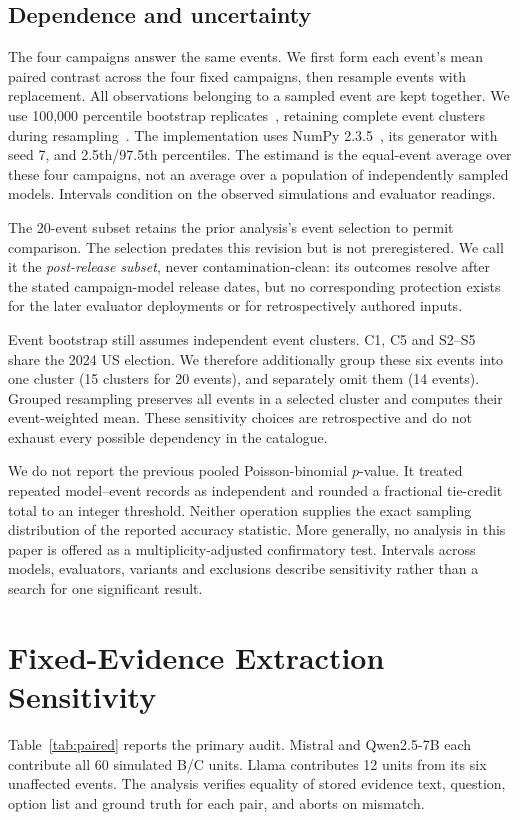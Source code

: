 \documentclass[10pt,conference]{IEEEtran}
\begin{document}
\subsection{Dependence and uncertainty}
\label{sec:inference}
The four campaigns answer the same events. We first form each event's mean
paired contrast across the four fixed campaigns, then resample events with
replacement. All observations belonging to a sampled event are kept together.
We use 100,000 percentile bootstrap replicates~\cite{efron1979}, retaining
complete event clusters during resampling~\cite{cameron2008cluster}. The
implementation uses NumPy 2.3.5~\cite{harris2020numpy}, its generator with seed 7,
and 2.5th/97.5th percentiles. The estimand is the equal-event average over these
four campaigns, not an average over a population of independently sampled models.
Intervals condition on the observed simulations and evaluator readings.

The 20-event subset retains the prior analysis's event selection to permit
comparison. The selection predates this revision but is not preregistered.
We call it the \emph{post-release subset}, never contamination-clean:
its outcomes resolve after the stated campaign-model release dates, but no
corresponding protection exists for the later evaluator deployments or for
retrospectively authored inputs.

Event bootstrap still assumes independent event clusters. C1, C5 and S2--S5
share the 2024 US election. We therefore additionally group these six events
into one cluster (15 clusters for 20 events), and separately omit them
(14 events). Grouped resampling preserves all events in a selected cluster
and computes their event-weighted mean. These sensitivity choices are
retrospective and do not exhaust every possible dependency in the catalogue.

We do not report the previous pooled Poisson-binomial $p$-value. It treated
repeated model--event records as independent and rounded a fractional tie-credit
total to an integer threshold. Neither operation supplies the exact sampling
distribution of the reported accuracy statistic. More generally, no analysis
in this paper is offered as a multiplicity-adjusted confirmatory test.
Intervals across models, evaluators, variants and exclusions describe
sensitivity rather than a search for one significant result.

\section{Fixed-Evidence Extraction Sensitivity}
\label{sec:paired}
Table~\ref{tab:paired} reports the primary audit. Mistral and Qwen2.5-7B each
contribute all 60 simulated B/C units. Llama contributes 12 units from its
six unaffected events. The analysis verifies equality of stored evidence text,
question, option list and ground truth for each pair, and aborts on mismatch.
\end{document}
